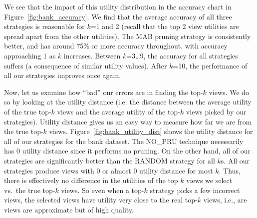 We see that the impact of this utility distribution in the accuracy chart in
Figure~\ref{fig:bank_accuracy}.
We find that the average accuracy of all three strategies is reasonable for
$k$=1 and 2 (recall that the top $2$ view utilities 
are spread apart from the other utilities). The MAB pruning strategy is 
consistently better, and has around 75\% or more accuracy throughout,
with accuracy approaching 1 as $k$ increases.
Between $k$=3\ldots9, the accuracy for all strategies suffers 
(a consequence of similar utility values).
After $k$=10, the performance of all our strategies improves once again.

Now, let us examine how ``bad'' our errors are in finding the top-$k$ views.
We do so by looking at the utility distance (i.e. the distance between
the average utility of the true top-$k$ views and the average utility of the
top-$k$ views picked by our strategies).
Utility distance gives us an easy way to measure how far we are from the true
top-$k$ views.
Figure~\ref{fig:bank_utility_dist} shows the utility distance for
all of our strategies for the bank dataset.
The NO\_PRU technique necessarily has 0 utility distance since
it performs no pruning.
On the other hand, all of our strategies are significantly better than the RANDOM
strategy for all $k$s.
All our strategies produce views with 0 or almost 0 utility distance for most $k$. 
Thus, there is effectively no difference in the utilities of the top $k$ views
we select vs.~the true top-$k$ views.
So even when a top-$k$ strategy picks a few incorrect views, the selected views
have utility very close to the real top-$k$ views, i.e., are views are
approximate but of high quality.

